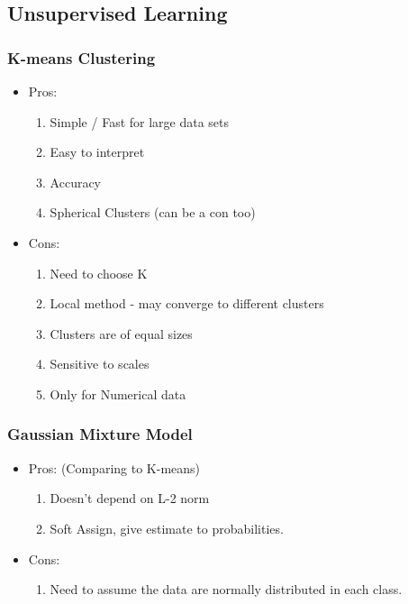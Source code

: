 \documentclass[12pt]{amsart}
\numberwithin{equation}{section}
\theoremstyle{plain}
\theoremstyle{definition}
\begin{document}
\subsection{Unsupervised Learning}

\subsubsection{K-means Clustering}

\begin{itemize}
\item Pros: 

\begin{enumerate}
\item Simple / Fast for large data sets
\item Easy to interpret
\item Accuracy
\item Spherical Clusters (can be a con too)
\end{enumerate}

\item Cons:

\begin{enumerate}
\item Need to choose K
\item Local method - may converge to different clusters
\item Clusters are of equal sizes
\item Sensitive to scales
\item Only for Numerical data
\end{enumerate}

\end{itemize}

\subsubsection{Gaussian Mixture Model}

\begin{itemize}
\item Pros: (Comparing to K-means)

\begin{enumerate}
\item Doesn't depend on L-2 norm
\item Soft Assign, give estimate to probabilities.
\end{enumerate}

\item Cons:

\begin{enumerate}
\item Need to assume the data are normally distributed in each class.
\end{enumerate}

\end{itemize}
\end{document}
